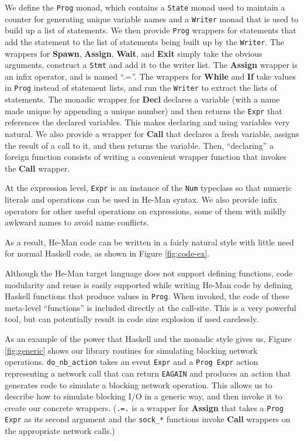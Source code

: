\documentclass[preprint]{sigplanconf}
\renewcommand{\t}{\texttt}
\renewcommand{\b}{\textbf}
\begin{document}
We define the \t{Prog} monad, which contains a \t{State} monad used to
maintain a counter for generating unique variable names and a
\t{Writer} monad that is used to build up a list of statements. We
then provide \t{Prog} wrappers for statements that add the statement
to the list of statements being built up by the \t{Writer}. The
wrappers for \b{Spawn}, \b{Assign}, \b{Wait}, and \b{Exit} simply take
the obvious arguments, construct a \t{Stmt} and add it to the writer
list. The \b{Assign} wrapper is an infix operator, and is named
``.=''. The wrappers for \b{While} and \b{If} take values in \t{Prog}
instead of statement lists, and run the \t{Writer} to extract the
lists of statements. The monadic wrapper for \b{Decl} declares a
variable (with a name made unique by appending a unique number) and
then returns the \t{Expr} that references the declared variables. This
makes declaring and using variables very natural. We also provide a
wrapper for \b{Call} that declares a fresh variable, assigns the
result of a call to it, and then returns the variable. Then,
``declaring'' a foreign function consists of writing a convenient
wrapper function that invokes the \b{Call} wrapper.

At the expression level, \t{Expr} is an instance of the \t{Num} typeclass 
so that numeric literals and operations can be used in He-Man
syntax. We also provide infix operators for other useful operations on
expressions, some of them with mildly awkward names to avoid name conflicts.

As a result, He-Man code can be written in a fairly natural style with little
need for normal Haskell code, as shown in Figure \ref{fig:code-ex}.

Although the He-Man target language does not support defining
functions, code modularity and reuse is easily supported while writing
He-Man code by defining Haskell functions that produce values in
\t{Prog}. When invoked, the code of these meta-level ``functions'' is
included directly at the call-site. This is a very powerful tool, but
can potentially result in code size explosion if used carelessly.

As an example of the power that Haskell and the monadic style gives
us, Figure \ref{fig:generic} shows our library routines for simulating
blocking network operations. \t{do\_nb\_action} takes an event
\t{Expr} and a \t{Prog Expr} action representing a network call that
can return \t{EAGAIN} and produces an action that generates code to
simulate a blocking network operation. This allows us to describe how
to simulate blocking I/O in a generic way, and then invoke it to
create our concrete wrappers. (\t{.=.} is a wrapper for \b{Assign} 
that takes a \t{Prog Expr} as its second argument and the \t{sock\_*} 
functions invoke \b{Call} wrappers on the appropriate network calls.)
\end{document}
